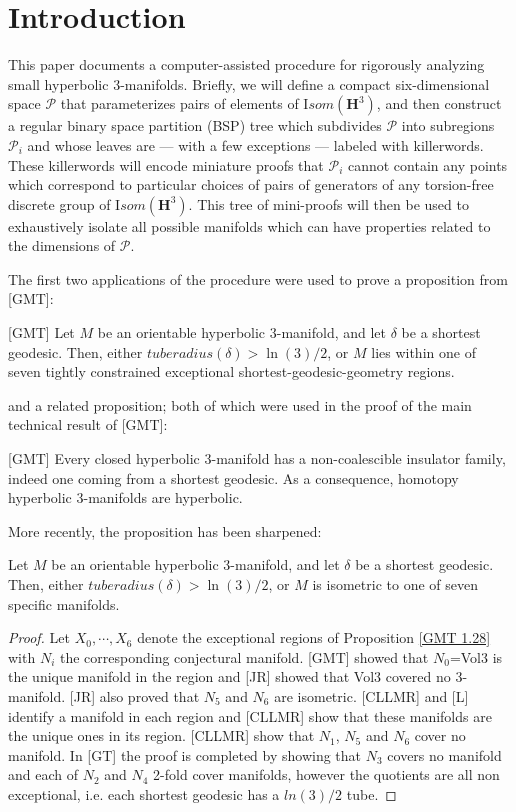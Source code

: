 \def\Arccosh{{\mathrm Arccosh}}
\chapter{Introduction}

This paper documents a computer-assisted procedure
for rigorously analyzing small hyperbolic $3$-manifolds.
Briefly, we will define a compact six-dimensional space ${\mathcal P}$
that parameterizes pairs of elements of ${\mathrm Isom}({\mathbf H}^3)$,
and then construct a regular binary space partition (BSP) tree
which subdivides ${\mathcal P}$ into subregions ${\mathcal P_i}$
and whose leaves are --- with a few exceptions --- labeled with killerwords.
These killerwords will encode miniature proofs that ${\mathcal P_i}$
cannot contain any points which correspond to
particular choices of pairs of generators of
any torsion-free discrete group of ${\mathrm Isom}({\mathbf H}^3)$.
This tree of mini-proofs will then be used
to exhaustively isolate all possible manifolds
which can have properties related to the dimensions of ${\mathcal P}$.

The first two applications of the procedure
were used to prove a proposition from [GMT]:

\begin{proposition}{[GMT]}
Let $M$ be an orientable hyperbolic $3$-manifold, and let $\delta$ be
a shortest geodesic. Then, either ${\mathit tuberadius}(\delta) > \ln(3)/2$,
or $M$ lies within one of seven tightly constrained
exceptional shortest-geodesic-geometry regions.
\end{proposition}

and a related proposition; both of which were used in the proof of
the main technical result of [GMT]:
\begin{theorem}{[GMT]}
Every closed hyperbolic $3$-manifold
has a non-coalescible insulator family,
indeed one coming from a shortest geodesic.
As a consequence,
homotopy hyperbolic $3$-manifolds are hyperbolic.
\end{theorem}
More recently, the proposition has been sharpened:
\begin{theorem}{}
Let $M$ be an orientable hyperbolic $3$-manifold,
and let $\delta$ be a shortest geodesic.
Then, either ${\mathit tuberadius}(\delta) > \ln(3)/2$, or
$M$ is isometric to one of seven specific manifolds.
\end{theorem}
\begin{proof}{}
	Let $X_0, \cdots, X_6$ denote the exceptional regions of Proposition \ref{GMT 1.28}
with $N_i$ the corresponding conjectural manifold.
[GMT] showed that $N_0$=Vol3 is the unique manifold in the region
and [JR] showed that Vol3 covered no 3-manifold.
[JR] also proved that $N_5$ and $N_6$ are isometric.
[CLLMR] and [L] identify a manifold in each region
and [CLLMR] show that these manifolds are the unique ones in its region.
[CLLMR] show that $N_1$, $N_5$ and $N_6$ cover no manifold.
In [GT] the proof is completed by showing that $N_3$ covers no manifold
and each of $N_2$ and $N_4$ 2-fold cover manifolds,
however the quotients are all non exceptional,
i.e. each shortest geodesic has a $ln(3)/2$ tube.
\end{proof}

